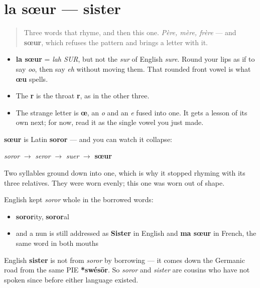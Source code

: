 \section[la sœur]{la sœur — sister}

\label{lesson:FR-C10-soeur}



\begin{quote}
Three words that rhyme, and then this one. \emph{Père, mère, frère} — and \textbf{sœur}, which refuses the pattern and brings a letter with it.
\end{quote}

\begin{sounds}
\begin{itemize}
\raggedright
  \item \textbf{la sœur} = \emph{lah SUR}, but not the \emph{sur} of English \emph{sure}. Round your lips as if to say \emph{oo}, then say \emph{eh} without moving them. That rounded front vowel is what \textbf{œu} spells.
  \item The \textbf{r} is the throat \textbf{r}, as in the other three.
  \item The strange letter is \textbf{œ}, an \emph{o} and an \emph{e} fused into one. It gets a lesson of its own next; for now, read it as the single vowel you just made.
\end{itemize}
\end{sounds}

\begin{cousinweb}
\textbf{sœur} is Latin \textbf{soror} — and you can watch it collapse:

\emph{soror} $\to$ \emph{seror} $\to$ \emph{suer} $\to$ \textbf{sœur}

Two syllables ground down into one, which is why it stopped rhyming with its three relatives. They were worn evenly; this one was worn out of shape.

English kept \emph{soror} whole in the borrowed words:

\begin{itemize}
\raggedright
  \item \textbf{soror}ity, \textbf{soror}al
  \item and a nun is still addressed as \textbf{Sister} in English and \textbf{ma sœur} in French, the same word in both mouths
\end{itemize}

English \textbf{sister} is not from \emph{soror} by borrowing — it comes down the Germanic road from the same PIE \textbf{*swésōr}. So \emph{soror} and \emph{sister} are cousins who have not spoken since before either language existed.
\end{cousinweb}

